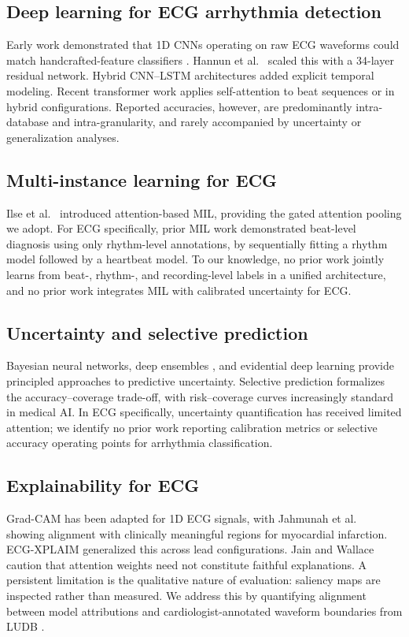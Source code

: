 \documentclass[conference]{IEEEtran}
\begin{document}
\subsection{Deep learning for ECG arrhythmia detection}
Early work demonstrated that 1D CNNs operating on raw ECG waveforms could match handcrafted-feature classifiers \cite{acharya2017}. Hannun et al.~\cite{hannun2019} scaled this with a 34-layer residual network. Hybrid CNN--LSTM architectures \cite{oh2018,yildirim2018} added explicit temporal modeling. Recent transformer work \cite{ecgformer2024,ecgtransform2024} applies self-attention to beat sequences or in hybrid configurations. Reported accuracies, however, are predominantly intra-database and intra-granularity, and rarely accompanied by uncertainty or generalization analyses.

\subsection{Multi-instance learning for ECG}
Ilse et al.~\cite{ilse2018} introduced attention-based MIL, providing the gated attention pooling we adopt. For ECG specifically, prior MIL work \cite{wang2022_milecg} demonstrated beat-level diagnosis using only rhythm-level annotations, by sequentially fitting a rhythm model followed by a heartbeat model. To our knowledge, no prior work jointly learns from beat-, rhythm-, and recording-level labels in a unified architecture, and no prior work integrates MIL with calibrated uncertainty for ECG.

\subsection{Uncertainty and selective prediction}
Bayesian neural networks, deep ensembles \cite{lakshmi2017}, and evidential deep learning \cite{sensoy2018,kendall2017} provide principled approaches to predictive uncertainty. Selective prediction \cite{geifman2017} formalizes the accuracy--coverage trade-off, with risk--coverage curves increasingly standard in medical AI. In ECG specifically, uncertainty quantification has received limited attention; we identify no prior work reporting calibration metrics or selective accuracy operating points for arrhythmia classification.

\subsection{Explainability for ECG}
Grad-CAM \cite{selvaraju2017} has been adapted for 1D ECG signals, with Jahmunah et al.~\cite{jahmunah2022} showing alignment with clinically meaningful regions for myocardial infarction. ECG-XPLAIM \cite{pantelidis2025} generalized this across lead configurations. Jain and Wallace \cite{jain2019} caution that attention weights need not constitute faithful explanations. A persistent limitation is the qualitative nature of evaluation: saliency maps are inspected rather than measured. We address this by quantifying alignment between model attributions and cardiologist-annotated waveform boundaries from LUDB \cite{ludb2020}.
\end{document}
